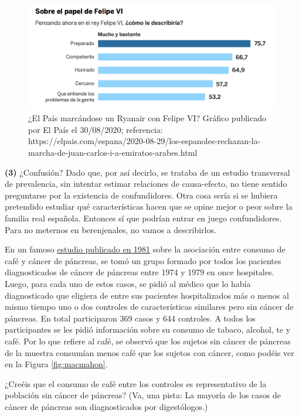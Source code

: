 \documentclass[
]{book}
\theoremstyle{definition}
\theoremstyle{definition}
\theoremstyle{definition}
\theoremstyle{definition}
\theoremstyle{remark}
\begin{document}
\begin{figure}

{\centering \includegraphics[width=0.8\linewidth]{INREMDN_files/figure-html/felipe6} 

}

\caption{¿El País marcándose un Ryanair con Felipe VI? Gráfico publicado por El País  el 30/08/2020; referencia: https://elpais.com/espana/2020-08-29/los-espanoles-rechazan-la-marcha-de-juan-carlos-i-a-emiratos-arabes.html}\label{fig:felipe6}
\end{figure}

\textbf{(3)} ¿Confusión? Dado que, por así decirlo, se trataba de un estudio transversal de prevalencia, sin intentar estimar relaciones de causa-efecto, no tiene sentido preguntarse por la existencia de confundidores. Otra cosa sería si se hubiera pretendido estudiar qué características hacen que se opine mejor o peor sobre la familia real española. Entonces sí que podrían entrar en juego confundidores. Para no meternos en berenjenales, no vamos a describirlos.

\begin{rmdexercici}
En un famoso \href{https://www.nejm.org/doi/full/10.1056/NEJM198103123041102}{estudio publicado en 1981} sobre la asociación entre consumo de café y cáncer de páncreas, se tomó un grupo formado por todos los pacientes diagnosticados de cáncer de páncreas entre 1974 y 1979 en once hospitales. Luego, para cada uno de estos casos, se pidió al médico que lo había diagnosticado que eligiera de entre sus pacientes hospitalizados más o menos al mismo tiempo uno o dos controles de características similares pero sin cáncer de páncreas. En total participaron 369 casos y 644 controles. A todos los participantes se les pidió información sobre su consumo de tabaco, alcohol, te y café. Por lo que refiere al café, se observó que los sujetos sin cáncer de páncreas de la muestra consumían menos café que los sujetos con cáncer, como podéis ver en la Figura \ref{fig:macmahon}.

¿Creéis que el consumo de café entre los controles es representativo de la población sin cáncer de páncreas? (Va, una pista: La mayoría de los casos de cáncer de páncreas son diagnosticados por digestólogos.)
\end{rmdexercici}
\end{document}

